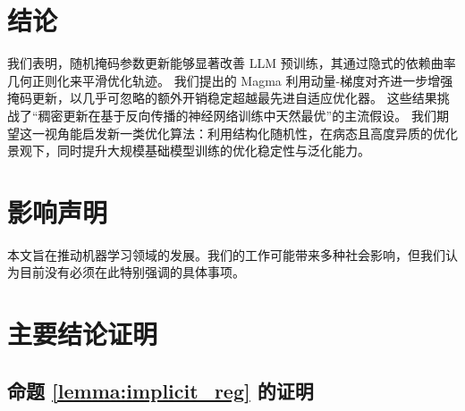 \documentclass[11pt, a4paper, twocolumn, copyright, goog]{google}
\theoremstyle{plain}
\theoremstyle{definition}
\theoremstyle{remark}
\begin{document}
\section{结论}
我们表明，随机掩码参数更新能够显著改善 LLM 预训练，其通过隐式的依赖曲率几何正则化来平滑优化轨迹。 
我们提出的 Magma 利用动量-梯度对齐进一步增强掩码更新，以几乎可忽略的额外开销稳定超越最先进自适应优化器。 
这些结果挑战了“稠密更新在基于反向传播的神经网络训练中天然最优”的主流假设。 
我们期望这一视角能启发新一类优化算法：利用结构化随机性，在病态且高度异质的优化景观下，同时提升大规模基础模型训练的优化稳定性与泛化能力。

\section*{影响声明}
本文旨在推动机器学习领域的发展。我们的工作可能带来多种社会影响，但我们认为目前没有必须在此特别强调的具体事项。



% 

\newpage
\appendix
\onecolumn


\setcounter{table}{0}
\renewcommand{\thetable}{A\arabic{table}}

\setcounter{figure}{0}
\renewcommand{\thefigure}{A\arabic{figure}}



\section{主要结论证明} \label{appx:proofs}


\subsection{命题 \ref{lemma:implicit_reg} 的证明} \label{appx:proof_prop1}
\end{document}
